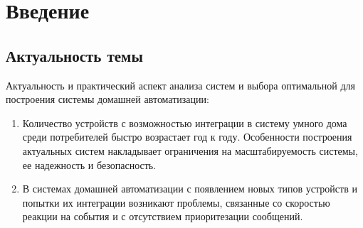 \documentclass[a4paper,12pt]{article}
\begin{document}
\newpage

\tableofcontents

\newpage




\section{Введение}

\subsection{Актуальность темы}

Актуальность и практический аспект анализа систем и выбора оптимальной для построения системы домашней автоматизации:

\begin{enumerate}
    \item	Количество устройств с возможностью интеграции в систему умного дома среди потребителей быстро возрастает год к году. Особенности построения актуальных систем накладывает ограничения на масштабируемость системы, ее надежность и безопасность.
    \item	В системах домашней автоматизации с появлением новых типов устройств и попытки их интеграции возникают проблемы, связанные со скоростью реакции на события и с отсутствием приоритезации сообщений.
\end{enumerate}
\end{document}
